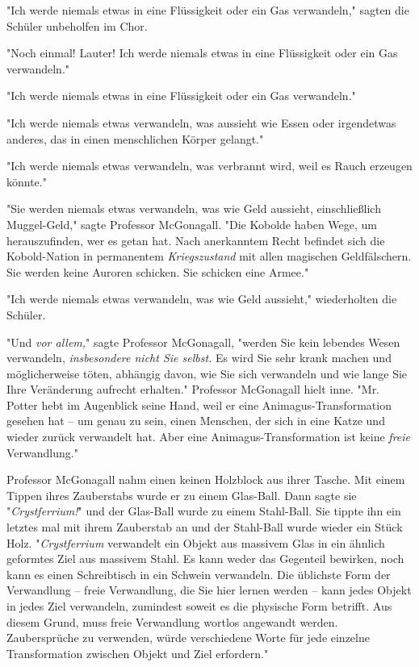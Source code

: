 {"Ich werde niemals etwas in eine Flüssigkeit oder ein Gas verwandeln," sagten die Schüler unbeholfen im Chor.

"Noch einmal! Lauter! Ich werde niemals etwas in eine Flüssigkeit oder ein Gas verwandeln."

"Ich werde niemals etwas in eine Flüssigkeit oder ein Gas verwandeln."

"Ich werde niemals etwas verwandeln, was aussieht wie Essen oder irgendetwas anderes, das in einen menschlichen Körper gelangt."

"Ich werde niemals etwas verwandeln, was verbrannt wird, weil es Rauch erzeugen könnte."

"Sie werden niemals etwas verwandeln, was wie Geld aussieht, einschließlich Muggel-Geld," sagte Professor McGonagall. "Die Kobolde haben Wege, um herauszufinden, wer es getan hat. Nach anerkanntem Recht befindet sich die Kobold-Nation in permanentem \emph{Kriegszustand} mit allen magischen Geldfälschern. Sie werden keine Auroren schicken. Sie schicken eine Armee."

"Ich werde niemals etwas verwandeln, was wie Geld aussieht," wiederholten die Schüler.

"Und \emph{vor allem,}" sagte Professor McGonagall, "werden Sie kein lebendes Wesen verwandeln, \emph{insbesondere nicht Sie selbst.} Es wird Sie sehr krank machen und möglicherweise töten, abhängig davon, wie Sie sich verwandeln und wie lange Sie Ihre Veränderung aufrecht erhalten." Professor McGonagall hielt inne. "Mr. Potter hebt im Augenblick seine Hand, weil er eine Animagus-Transformation gesehen hat -- um genau zu sein, einen Menschen, der sich in eine Katze und wieder zurück verwandelt hat. Aber eine Animagus-Transformation ist keine \emph{freie} Verwandlung."

Professor McGonagall nahm einen keinen Holzblock aus ihrer Tasche. Mit einem Tippen ihres Zauberstabs wurde er zu einem Glas-Ball. Dann sagte sie "\emph{Crystferrium!}" und der Glas-Ball wurde zu einem Stahl-Ball. Sie tippte ihn ein letztes mal mit ihrem Zauberstab an und der Stahl-Ball wurde wieder ein Stück Holz. "\emph{Crystferrium} verwandelt ein Objekt aus massivem Glas in ein ähnlich geformtes Ziel aus massivem Stahl. Es kann weder das Gegenteil bewirken, noch kann es einen Schreibtisch in ein Schwein verwandeln. Die üblichste Form der Verwandlung -- freie Verwandlung, die Sie hier lernen werden -- kann jedes Objekt in jedes Ziel verwandeln, zumindest soweit es die physische Form betrifft. Aus diesem Grund, muss freie Verwandlung wortlos angewandt werden. Zaubersprüche zu verwenden, würde verschiedene Worte für jede einzelne Transformation zwischen Objekt und Ziel erfordern."

}
